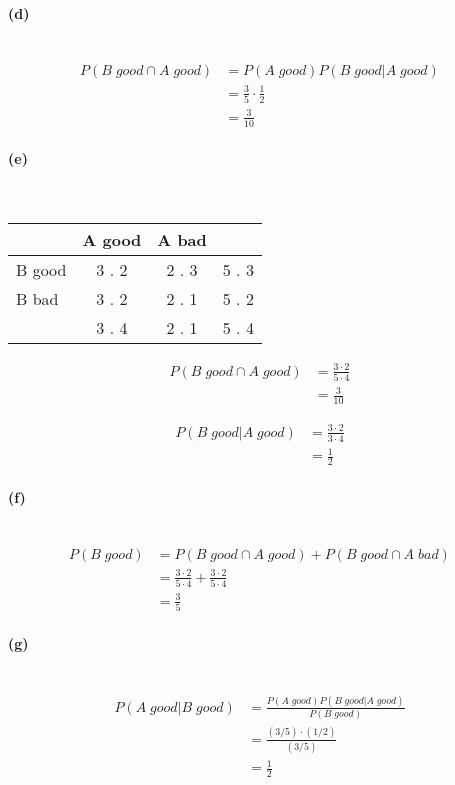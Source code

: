 \documentclass[a4paper]{article}
\begin{document}
\paragraph{(d)} ~\\
\begin{align*}
P(B \; good \cap A \; good) &= P(A \; good) P(B \; good | A \; good) \\
                            &= \frac{3}{5} \cdot \frac{1}{2} \\
                            &= \frac{3}{10}
\end{align*}

\paragraph{(e)} ~\\

\begin{tabular}{l c c | r}
       & A good & A bad \\
\hline
B good & 3 . 2  & 2 . 3 & 5 . 3 \\
B bad  & 3 . 2  & 2 . 1 & 5 . 2 \\
\hline
       & 3 . 4  & 2 . 1 & 5 . 4
\end{tabular}

\begin{align*}
P(B \; good \cap A \; good) &= \frac{3 \cdot 2}{5 \cdot 4} \\
                            &= \frac{3}{10}
\end{align*}

\begin{align*}
P(B \; good | A \; good) &= \frac{3 \cdot 2}{3 \cdot 4} \\
                            &= \frac{1}{2}
\end{align*}

\paragraph{(f)} ~\\
\begin{align*}
P(B \; good) &= P(B \; good \cap A \; good) + P(B \; good \cap A \; bad) \\
             &= \frac{3 \cdot 2}{5 \cdot 4} + \frac{3 \cdot 2}{5 \cdot 4} \\
             &= \frac{3}{5}
\end{align*}

\paragraph{(g)} ~\\
\begin{align*}
P(A \; good | B \; good) &= \frac{P(A \; good) P(B \; good | A \; good)}{P(B \; good)} \\
                         &= \frac{(3/5) \cdot (1/2)}{(3/5)} \\
                         &= \frac{1}{2}
\end{align*}
\end{document}
